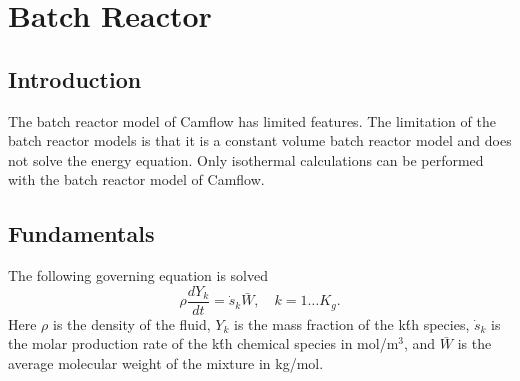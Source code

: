 \newpage
\chapter{Batch Reactor}

\section{Introduction}
The batch reactor model of Camflow has limited features. The limitation of the batch reactor models is that it is a constant volume batch reactor model and does not solve the energy equation. Only isothermal calculations can be performed with the batch reactor model of Camflow. 

\section{Fundamentals}
The following governing equation is solved
\begin{equation}
 \rho \frac{dY_k}{dt} = \dot{s}_k \bar{W}, \quad k=1\ldots K_g.
\end{equation}
Here $\rho$ is the density of the fluid, $Y_k$ is the mass fraction of the k\'th species, $\dot{s}_k$ is the molar production rate of the k\'th chemical species in mol/m$^3$, and $\bar{W}$ is the average molecular weight of the mixture in kg/mol.


